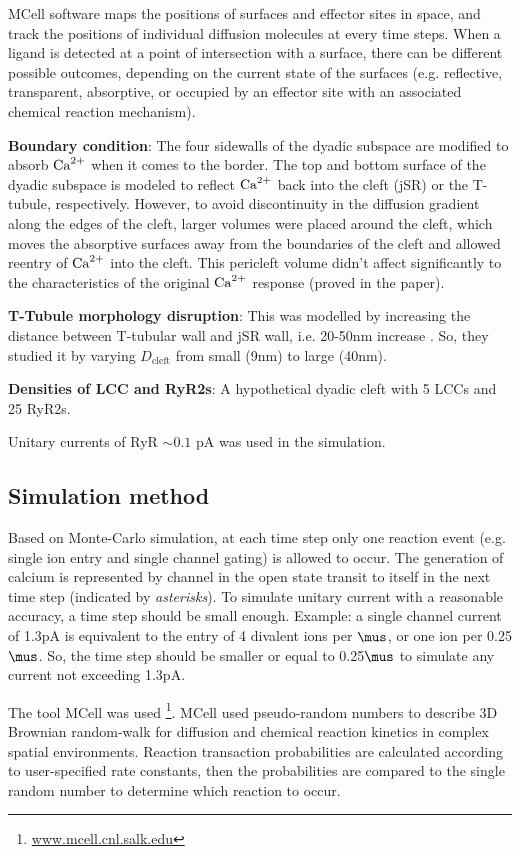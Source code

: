 MCell software maps the positions of surfaces and effector sites in space, and
track the positions of individual diffusion molecules at every time steps. When
a ligand is detected at a point of intersection with a surface, there can be
different possible outcomes, depending on the current state of the
surfaces (e.g. reflective, transparent, absorptive, or occupied by an effector
site with an associated chemical reaction mechanism).

{\bf Boundary condition}: The four sidewalls of the dyadic subspace are modified
to absorb ${\text{Ca}^{2+}}$ when it comes to the border. The top and bottom surface of the
dyadic subspace is modeled to reflect ${\text{Ca}^{2+}}$ back into the cleft (jSR) or the
T-tubule, respectively. However, to avoid discontinuity in the diffusion
gradient along the edges of the cleft, larger volumes were placed around the
cleft, which moves the absorptive surfaces away from the boundaries of the cleft
and allowed reentry of ${\text{Ca}^{2+}}$ into the cleft. This pericleft volume didn't affect
significantly to the characteristics of the original ${\text{Ca}^{2+}}$ response (proved
in the paper). 

{\bf T-Tubule morphology disruption}: This was modelled by increasing the
distance between T-tubular wall and jSR wall, i.e. 20-50nm increase
\citep{lohn2000}. So, they studied it by varying $D_\text{cleft}$ from small
(9nm) to large (40nm). 

{\bf Densities of LCC and RyR2s}: A hypothetical dyadic cleft with 5 LCCs and 25
RyR2s. 

Unitary currents of RyR $\sim 0.1$ pA was used in the simulation. 

\subsection{Simulation method}

Based on Monte-Carlo simulation, at each time step only one reaction event (e.g.
single ion entry and single channel gating) is allowed to occur. The generation
of calcium is represented by channel in the open state transit to itself in the
next time step (indicated by {\it asterisks}). To simulate unitary current with
a reasonable accuracy, a time step should be small enough. Example: a single
channel current of 1.3pA is equivalent to the entry of 4 divalent ions per
$\mus$, or one ion per 0.25$\mus$. So, the time step should be smaller or equal
to 0.25$\mus$ to simulate any current not exceeding 1.3pA. 

The tool MCell was used \footnote{\url{www.mcell.cnl.salk.edu}}. MCell used
pseudo-random numbers to describe 3D Brownian random-walk for
diffusion and chemical reaction kinetics in complex spatial environments.
Reaction transaction probabilities are calculated according to user-specified
rate constants, then the probabilities are compared to the single random number
to determine which reaction to occur.

